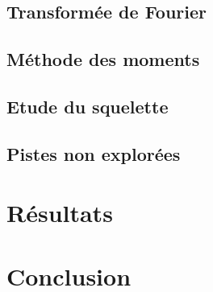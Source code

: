 \documentclass{article}
\begin{document}
    \subsection{Transformée de Fourier}
    
    \subsection{Méthode des moments}
    
    \subsection{Etude du squelette}
    
    \subsection{Pistes non explorées}
  
  \section{Résultats}
  
  \section{Conclusion}
  
\end{document}
